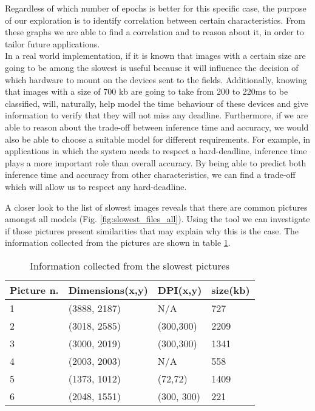 Regardless of which number of epochs is better for this specific case, the purpose of our exploration is to identify correlation between certain characteristics. From these graphs we are able to find a correlation and to reason about it, in order to tailor future applications. \\
In a real world implementation, if it is known that images with a certain size are going to be among the slowest is useful because it will influence the decision of which hardware to mount on the devices sent to the fields. Additionally, knowing that images with a size of 700 kb are going to take from 200 to 220ms to be classified, will, naturally, help model the time behaviour of these devices and give information to verify that they will not miss any deadline. Furthermore, if we are able to reason about the trade-off between inference time and accuracy, we would also be able to choose a suitable model for different requirements. For example, in applications in which the system needs to respect a hard-deadline, inference time plays a more important role than overall accuracy. By being able to predict both inference time and accuracy from other characteristics, we can find a trade-off which will allow us to respect any hard-deadline. 


A closer look to the list of slowest images reveals that there are common pictures amongst all models (Fig. \ref{fig:slowest_files_all}). Using the tool we can investigate if those pictures present similarities that may explain why this is the case. The information collected from the pictures are shown in table 
\ref{tab:pictures_info}.

\begin{table}[htbp]
\centering
\begin{tabular}{ p{2cm} p{4cm}  p{2cm}  p{2cm}  }
 Picture n.& Dimensions(x,y) & DPI(x,y)&size(kb) \\
 \hline
1&(3888, 2187)&N/A& 727\\
2&(3018, 2585)&(300,300)&2209\\
3&(3000, 2019)&(300,300)&1341\\
4&(2003, 2003)&N/A&558\\
5&(1373, 1012)&(72,72)&1409\\
6&(2048, 1551)&(300, 300)&221\\
 \hline
\end{tabular}
\caption{Information collected from the slowest pictures}
\label{tab:pictures_info}
\end{table}

